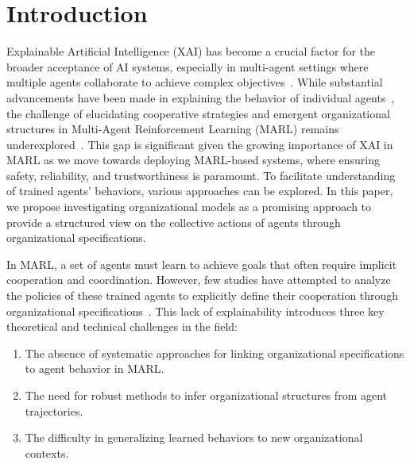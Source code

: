 \documentclass[sn-mathphys-num]{sn-jnl}%
\theoremstyle{thmstyleone}%
\theoremstyle{thmstyletwo}%
\theoremstyle{thmstylethree}%
\begin{document}



\maketitle

\section{Introduction}
\label{sec:intro}

Explainable Artificial Intelligence (XAI) has become a crucial factor for the broader acceptance of AI systems, especially in multi-agent settings where multiple agents collaborate to achieve complex objectives~\cite{doshivelez2017rigorous,gunning2019xai}. While substantial advancements have been made in explaining the behavior of individual agents~\cite{ribeiro2016classifier,lundberg2017unified}, the challenge of elucidating cooperative strategies and emergent organizational structures in Multi-Agent Reinforcement Learning (MARL) remains underexplored~\cite{busoniu2008survey}. This gap is significant given the growing importance of XAI in MARL as we move towards deploying MARL-based systems, where ensuring safety, reliability, and trustworthiness is paramount. To facilitate understanding of trained agents' behaviors, various approaches can be explored. In this paper, we propose investigating organizational models as a promising approach to provide a structured view on the collective actions of agents through organizational specifications.

In MARL, a set of agents must learn to achieve goals that often require implicit cooperation and coordination. However, few studies have attempted to analyze the policies of these trained agents to explicitly define their cooperation through organizational specifications~\cite{albrecht2018survey,perolat2017pool}. This lack of explainability introduces three key theoretical and technical challenges in the field:
\begin{enumerate}
    \item The absence of systematic approaches for linking organizational specifications to agent behavior in MARL.
    \item The need for robust methods to infer organizational structures from agent trajectories.
    \item The difficulty in generalizing learned behaviors to new organizational contexts.
\end{enumerate}
\end{document}
